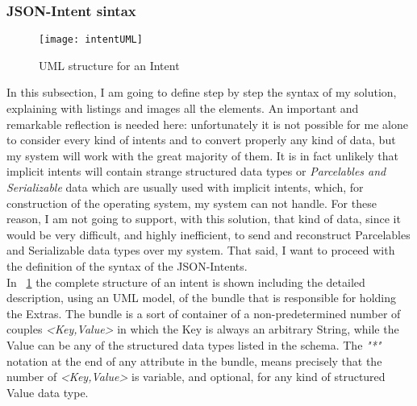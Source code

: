 \subsubsection{JSON-Intent sintax}\label{syntax}
\begin{figure}[h!]
	\centering
	\texttt{[image: intentUML]}
	\caption{UML  structure for an Intent}
	\label{fig:4.4}
\end{figure}
In this subsection, I am going to define step by step the syntax of my solution, explaining with listings and images all the elements.
An important and remarkable reflection is needed here: unfortunately it is not possible for me alone to consider every kind of intents and to convert properly any kind of data, but my system will work with the great majority of them. It is in fact unlikely that implicit intents will contain strange structured data types or \textit{Parcelables and Serializable} data which are usually used with implicit intents, which, for construction of the operating system, my system can not handle. For these reason, I am not going to support, with this solution, that kind of data, since it would be very difficult, and highly inefficient, to send and reconstruct Parcelables and Serializable data types over my system. That said, I want to proceed with the definition of the syntax of the JSON-Intents.\\
In \figurename~\ref{fig:4.4} the complete structure of an intent is shown including the detailed description, using an UML model, of the bundle that is responsible for holding the Extras. The bundle is a sort of container of a non-predetermined number of couples \textit{<Key,Value>} in which the Key is always an arbitrary String, while the Value can be any of the structured data types listed in the schema.
The \textit{"*"} notation at the end of any attribute in the bundle, means precisely that the number of \textit{<Key,Value>} is variable, and optional, for any kind of structured Value data type.\\
